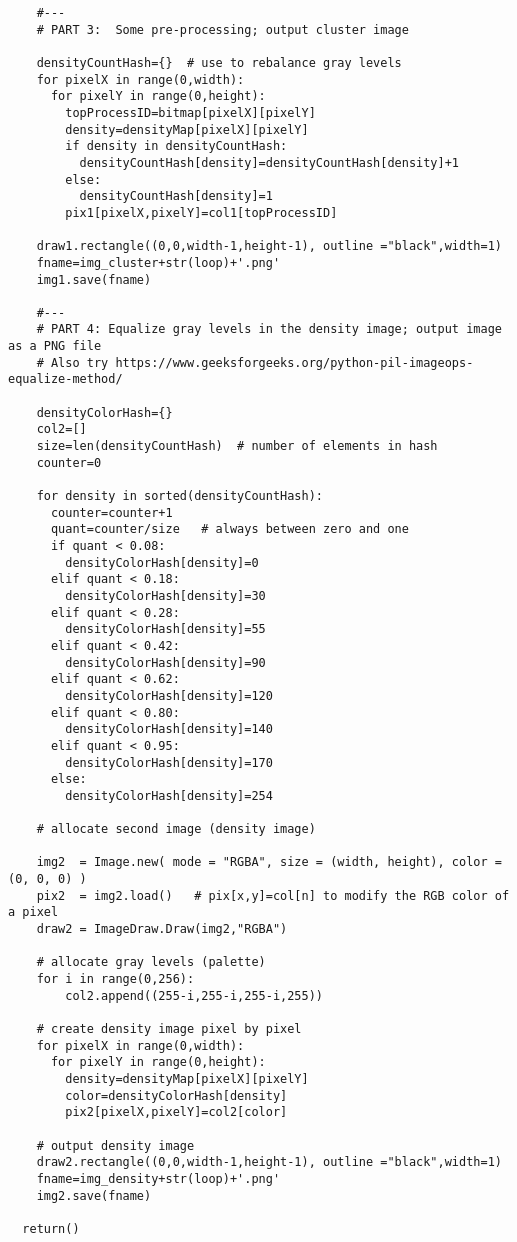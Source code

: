 \documentclass[oneside,10pt]{book}
\begin{document}
\begin{lstlisting}
    #---
    # PART 3:  Some pre-processing; output cluster image

    densityCountHash={}  # use to rebalance gray levels
    for pixelX in range(0,width): 
      for pixelY in range(0,height):   
        topProcessID=bitmap[pixelX][pixelY]
        density=densityMap[pixelX][pixelY]
        if density in densityCountHash:
          densityCountHash[density]=densityCountHash[density]+1
        else:
          densityCountHash[density]=1
        pix1[pixelX,pixelY]=col1[topProcessID]

    draw1.rectangle((0,0,width-1,height-1), outline ="black",width=1)
    fname=img_cluster+str(loop)+'.png'
    img1.save(fname)

    #---
    # PART 4: Equalize gray levels in the density image; output image as a PNG file 
    # Also try https://www.geeksforgeeks.org/python-pil-imageops-equalize-method/

    densityColorHash={} 
    col2=[]
    size=len(densityCountHash)  # number of elements in hash
    counter=0

    for density in sorted(densityCountHash):
      counter=counter+1
      quant=counter/size   # always between zero and one
      if quant < 0.08: 
        densityColorHash[density]=0
      elif quant < 0.18:
        densityColorHash[density]=30 
      elif quant < 0.28:
        densityColorHash[density]=55
      elif quant < 0.42:
        densityColorHash[density]=90
      elif quant < 0.62:
        densityColorHash[density]=120
      elif quant < 0.80:
        densityColorHash[density]=140
      elif quant < 0.95:
        densityColorHash[density]=170
      else:
        densityColorHash[density]=254

    # allocate second image (density image)

    img2  = Image.new( mode = "RGBA", size = (width, height), color = (0, 0, 0) )
    pix2  = img2.load()   # pix[x,y]=col[n] to modify the RGB color of a pixel
    draw2 = ImageDraw.Draw(img2,"RGBA")

    # allocate gray levels (palette)
    for i in range(0,256):
        col2.append((255-i,255-i,255-i,255))

    # create density image pixel by pixel
    for pixelX in range(0,width): 
      for pixelY in range(0,height):   
        density=densityMap[pixelX][pixelY] 
        color=densityColorHash[density]
        pix2[pixelX,pixelY]=col2[color]  

    # output density image
    draw2.rectangle((0,0,width-1,height-1), outline ="black",width=1)
    fname=img_density+str(loop)+'.png'
    img2.save(fname)

  return()
\end{lstlisting}
\end{document}

